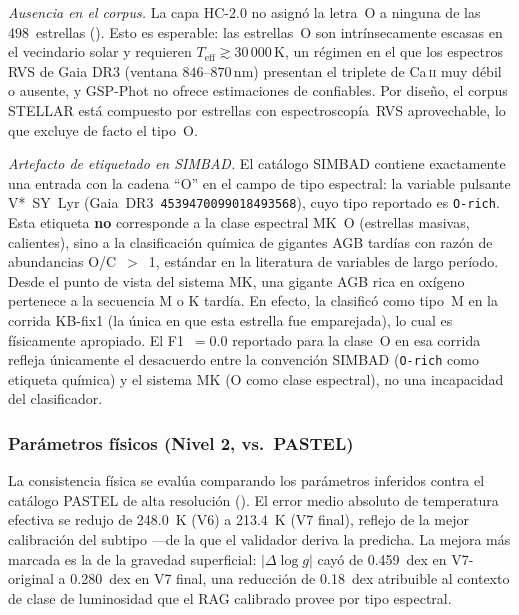 \emph{Ausencia en el corpus.} La capa HC-2.0 no asignó la letra~O a ninguna de las
\num{498}~estrellas (). Esto es esperable: las estrellas~O son
intrínsecamente escasas en el vecindario solar y requieren
$T_\mathrm{eff} \gtrsim 30\,000\,\si{\kelvin}$, un régimen en el que los espectros
RVS de Gaia DR3 (ventana $846$--$870$\,nm) presentan el triplete de Ca\,\textsc{ii}
muy débil o ausente, y GSP-Phot no ofrece estimaciones de \teff{} confiables.
Por diseño, el corpus STELLAR está compuesto por estrellas con espectroscopía~RVS
aprovechable, lo que excluye de facto el tipo~O.

\emph{Artefacto de etiquetado en SIMBAD.} El catálogo SIMBAD contiene exactamente
una entrada con la cadena ``O'' en el campo de tipo espectral: la variable pulsante
V*~SY~Lyr (Gaia~DR3~\texttt{4539470099018493568}), cuyo tipo reportado es
\texttt{O-rich}. Esta etiqueta \textbf{no} corresponde a la clase espectral MK~O
(estrellas masivas, calientes), sino a la clasificación química de gigantes AGB
tardías con razón de abundancias O/C~$>$~1, estándar en la literatura de variables
de largo período. Desde el punto de vista del sistema MK, una gigante AGB rica en
oxígeno pertenece a la secuencia M o K tardía. En efecto, \STELLAR{} la clasificó
como tipo~M en la corrida KB-fix1 (la única en que esta estrella fue emparejada), lo
cual es físicamente apropiado. El F1~$= 0.0$ reportado para la clase~O en esa
corrida refleja únicamente el desacuerdo entre la convención SIMBAD (\texttt{O-rich}
como etiqueta química) y el sistema MK (O como clase espectral), no una incapacidad
del clasificador.

\subsubsection{Parámetros físicos (Nivel 2, vs.\ PASTEL)}
\label{sec:res-l2}

La consistencia física se evalúa comparando los parámetros inferidos contra el
catálogo PASTEL de alta resolución (). El error medio absoluto de
temperatura efectiva se redujo de \SI{248.0}{\kelvin} (V6) a \SI{213.4}{\kelvin}
(V7 final), reflejo de la mejor calibración del subtipo ---de la que el validador
deriva la \teff{} predicha. La mejora más marcada es la de la gravedad
superficial: $|\Delta\log g|$ cayó de \num{0.459}~dex en V7-original a
\num{0.280}~dex en V7 final, una reducción de \num{0.18}~dex atribuible al
contexto de clase de luminosidad que el RAG calibrado provee por tipo espectral.

